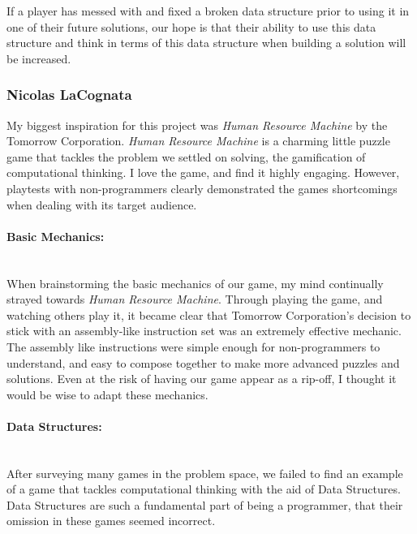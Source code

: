 If a player has messed with and fixed a broken data structure prior to using it in one of
their future solutions, our hope is that their ability to use this data structure and think in
terms of this data structure when building a solution will be increased.\\



\subsubsection{Nicolas LaCognata}
My biggest inspiration for this project was \textit{Human Resource Machine} by the Tomorrow Corporation.
\textit{Human Resource Machine} is a charming little puzzle game that tackles the problem we settled on solving,
the gamification of computational thinking. I love the game, and find it highly engaging. However, playtests
with non-programmers clearly demonstrated the games shortcomings when dealing with its target audience.

\paragraph{Basic Mechanics:} ~\\
When brainstorming the basic mechanics of our game, my mind continually strayed towards \textit{Human Resource Machine}.
Through playing the game, and watching others play it, it became clear that Tomorrow Corporation's decision to stick with
an assembly-like instruction set was an extremely effective mechanic.\\

The assembly like instructions were simple enough for non-programmers to understand, and easy to compose together to make more
advanced puzzles and solutions. Even at the risk of having our game appear as a rip-off, I thought it would be wise to adapt these mechanics.

\paragraph{Data Structures:} ~\\
After surveying many games in the problem space, we failed to find an example of a game that tackles computational thinking
with the aid of Data Structures. Data Structures are such a fundamental part of being a programmer, that their omission in these
games seemed incorrect.

